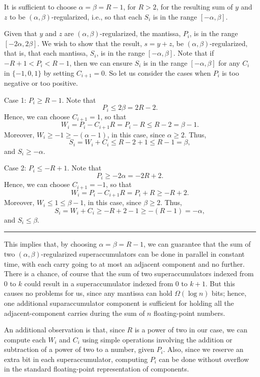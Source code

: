 \documentclass[11pt]{article}
\newenvironment{proof}{\noindent{\bf Proof:}}{\hspace*{\fill}\rule{6pt}{6pt}\bigskip}
\begin{document}
\begin{lemma}
It is sufficient to choose 
$ \alpha=\beta=R-1$,
for $R>2$,
for the resulting sum of $y$ and $z$ 
to be $(\alpha,\beta)$-regularized, i.e., so that each
$S_i$ is in the range $[-\alpha,\beta]$.  
\end{lemma}
\begin{proof}
Given that $y$ and $z$ are $(\alpha,\beta)$-regularized, the
mantissa, $P_i$, is in the range $[-2\alpha,2\beta]$.
We wish to show that the result, $s=y+z$, be $(\alpha,\beta)$-regularized,
that is, that each mantissa, $S_i$, is in the range
$[-\alpha,\beta]$.
Note that if $-R+1<P_i<R-1$, then we can ensure $S_i$ is
in the range $[-\alpha,\beta]$ for any $C_i$ in $\{-1,0,1\}$
by setting $C_{i+1}=0$.
So let us consider the cases when $P_i$ is too negative or too positive.

Case 1: $P_i\ge R-1$.
Note that
\[
P_i \le 2\beta = 2R-2.
\]
Hence, we can choose $C_{i+1}=1$, so that
\[
W_i = P_i - C_{i+1}R = P_i - R \le R-2 = \beta-1.
\]
Moreover, $W_i\ge -1 \ge -(\alpha-1)$, in this case, since $\alpha\ge 2$.
Thus, 
\[
S_i = W_i + C_i \le R-2+1 \le R-1 = \beta,
\]
and $S_i\ge -\alpha$.

Case 2: $P_i\le -R+1$.
Note that
\[
P_i \ge -2\alpha = -2R+2.
\]
Hence, we can choose $C_{i+1}=-1$, so that
\[
W_i = P_i - C_{i+1}R = P_i + R \ge -R+2.
\]
Moreover, $W_i\le 1 \le \beta-1$, in this case, since $\beta\ge 2$.
Thus,
\[
S_i = W_i + C_i \ge -R+2-1 \ge -(R-1) = -\alpha,
\]
and $S_i\le \beta$.
\end{proof}

This implies that, by choosing $\alpha=\beta=R-1$,
we can guarantee
that the sum of two $(\alpha,\beta)$-regularized
superaccumulators can be done
in parallel in constant time, with each carry going to at most an
adjacent component and no further.
There is a chance, of course that the sum of two superaccumulators
indexed from $0$ to $k$ could result in a superaccumulator
indexed from $0$ to $k+1$.
But this causes no problems for us, since any mantissa can hold
$\Omega(\log n)$ bits; hence, one additional suparaccumulator component
is sufficient for holding all the adjacent-component carries during the sum of 
$n$ floating-point numbers.

An additional observation is that, since $R$ is a power of two 
in our case, we
can compute each $W_i$ and $C_i$ using simple operations involving 
the addition or subtraction
of a power of two to a number,
given $P_i$. 
Also, since we reserve an extra bit in each superaccumulator,
computing $P_i$ can be done without overflow in the standard
floating-point representation of components.
\end{document}
